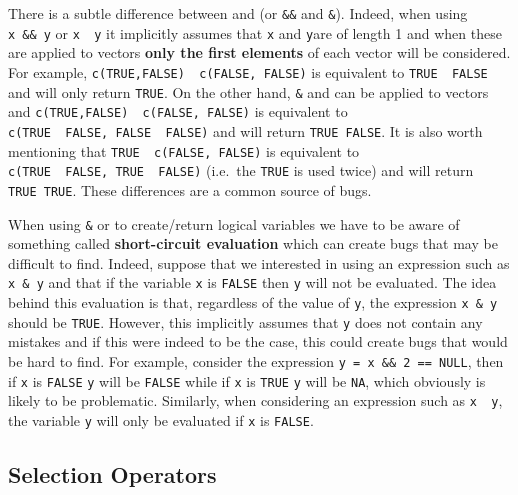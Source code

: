 \documentclass[12pt,]{krantz}
\let\BeginKnitrBlock\begin \let\EndKnitrBlock\end
\begin{document}
\BeginKnitrBlock{rmdnote}
There is a subtle difference between \texttt{\textbar{}\textbar{}}and
\texttt{\textbar{}} (or \texttt{\&\&} and \texttt{\&}). Indeed, when
using \texttt{x\ \&\&\ y} or \texttt{x\ \textbar{}\textbar{}\ y} it
implicitly assumes that \texttt{x} and \texttt{y}are of length 1 and
when these are applied to vectors \textbf{only the first elements} of
each vector will be considered. For example,
\texttt{c(TRUE,FALSE)\ \textbar{}\textbar{}\ c(FALSE,\ FALSE)} is
equivalent to \texttt{TRUE\ \textbar{}\textbar{}\ FALSE} and will only
return \texttt{TRUE}. On the other hand, \texttt{\&} and
\texttt{\textbar{}} can be applied to vectors and
\texttt{c(TRUE,FALSE)\ \textbar{}\textbar{}\ c(FALSE,\ FALSE)} is
equivalent to
\texttt{c(TRUE\ \textbar{}\textbar{}\ FALSE,\ FALSE\ \textbar{}\textbar{}\ FALSE)}
and will return \texttt{TRUE\ FALSE}. It is also worth mentioning that
\texttt{TRUE\ \textbar{}\ c(FALSE,\ FALSE)} is equivalent to
\texttt{c(TRUE\ \textbar{}\textbar{}\ FALSE,\ TRUE\ \textbar{}\textbar{}\ FALSE)}
(i.e.~the \texttt{TRUE} is used twice) and will return
\texttt{TRUE\ TRUE}. These differences are a common source of bugs.
\EndKnitrBlock{rmdnote}

\BeginKnitrBlock{rmdnote}
When using \texttt{\&} or \texttt{\textbar{}} to create/return logical
variables we have to be aware of something called \textbf{short-circuit
evaluation} which can create bugs that may be difficult to find. Indeed,
suppose that we interested in using an expression such as
\texttt{x\ \&\ y} and that if the variable \texttt{x} is \texttt{FALSE}
then \texttt{y} will not be evaluated. The idea behind this evaluation
is that, regardless of the value of \texttt{y}, the expression
\texttt{x\ \&\ y} should be \texttt{TRUE}. However, this implicitly
assumes that \texttt{y} does not contain any mistakes and if this were
indeed to be the case, this could create bugs that would be hard to
find. For example, consider the expression
\texttt{y\ =\ x\ \&\&\ 2\ ==\ NULL}, then if \texttt{x} is
\texttt{FALSE} \texttt{y} will be \texttt{FALSE} while if \texttt{x} is
\texttt{TRUE} \texttt{y} will be \texttt{NA}, which obviously is likely
to be problematic. Similarly, when considering an expression such as
\texttt{x\ \textbar{}\ y}, the variable \texttt{y} will only be
evaluated if \texttt{x} is \texttt{FALSE}.
\EndKnitrBlock{rmdnote}

\subsection{Selection Operators}\label{selection-operators}
\end{document}
